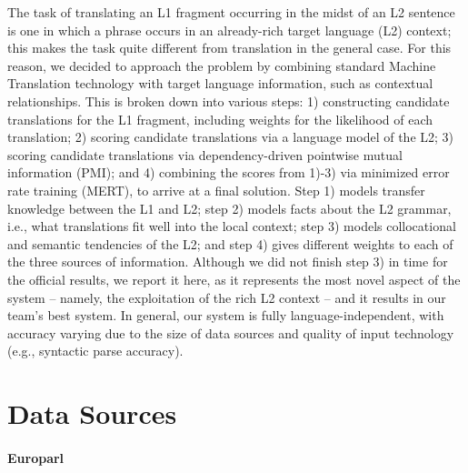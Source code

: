\documentclass[11pt]{article}
\begin{document}
The task of translating an L1 fragment occurring in the midst of an L2 sentence is one in which a phrase occurs in an already-rich target language (L2) context; this makes the task quite different from translation in the general case. For this reason, we decided to approach the problem by combining standard Machine Translation technology with target language information,
such as contextual relationships. 
This is broken down into various steps: 1) constructing candidate translations for the L1 fragment, including weights for the likelihood of each translation; 2) scoring candidate translations via a language model of the L2; 3) scoring candidate translations via dependency-driven pointwise mutual information (PMI); and 4) combining the scores from 1)-3) via minimized error rate training (MERT), to arrive at a final solution.  Step 1) models transfer knowledge between the L1 and L2; step 2) models facts about the L2 grammar, i.e., what translations fit well into the local context; step 3) models collocational and semantic tendencies of the L2; and step 4)  gives different weights to each of the three sources of information.  Although we did not finish step 3) in time for the official results, we report it here, as it represents the most novel aspect of the system -- namely, the exploitation of the rich L2 context -- and it results in our team's best system.  In general, our system is fully language-independent, with accuracy varying due to the size of data sources and quality of input technology (e.g., syntactic parse accuracy).

\section{Data Sources}


\paragraph{Europarl}  %
\end{document}
